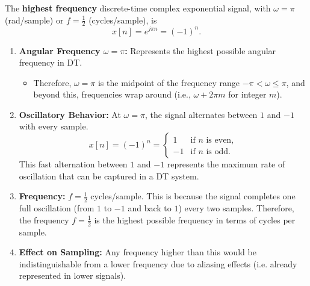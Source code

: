     \begin{example}
        The \textbf{highest frequency} discrete-time complex exponential signal, with \(\omega = \pi\) (rad/sample) or \(f = \frac{1}{2}\) (cycles/sample), is
            \[
            x[n] = e^{j \pi n} = (-1)^n.
            \]       

        \begin{enumerate}
            \item \textbf{Angular Frequency \(\omega = \pi\):}
            Represents the highest possible angular frequency in DT. 
            \begin{itemize}
                \item Therefore, \(\omega = \pi\) is the midpoint of the frequency range \( -\pi < \omega \leq \pi \), and beyond this, frequencies wrap around (i.e., \(\omega + 2\pi m\) for integer \(m\)).
            \end{itemize}

            \item \textbf{Oscillatory Behavior:}
            At \(\omega = \pi\), the signal alternates between \(1\) and \(-1\) with every sample.
            \[
            x[n] = (-1)^n = \begin{cases} 
                1 & \text{if } n \text{ is even}, \\
                -1 & \text{if } n \text{ is odd}.
            \end{cases}
            \]
            This fast alternation between \(1\) and \(-1\) represents the maximum rate of oscillation that can be captured in a DT system.

            \item \textbf{Frequency:}
            \(f = \frac{1}{2}\) cycles/sample. This is because the signal completes one full oscillation (from \(1\) to \(-1\) and back to \(1\)) every two samples. Therefore, the frequency \(f = \frac{1}{2}\) is the highest possible frequency in terms of cycles per sample.

            \item \textbf{Effect on Sampling:}
            Any frequency higher than this would be indistinguishable from a lower frequency due to aliasing effects (i.e. already represented in lower signals).
        \end{enumerate}
    \end{example}
        
